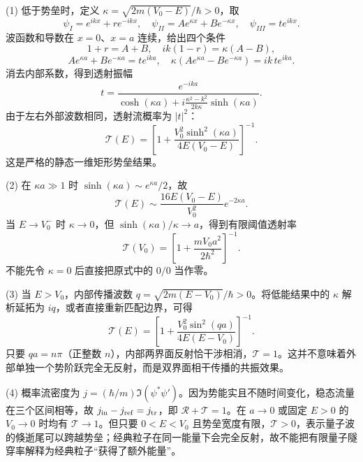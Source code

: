 (1) 低于势垒时，定义 \(\kappa=\sqrt{2m(V_0-E)}/\hbar>0\)，取
\[
\psi_I=e^{ikx}+r e^{-ikx},\quad
\psi_{II}=A e^{\kappa x}+B e^{-\kappa x},\quad
\psi_{III}=t e^{ikx}.
\]
波函数和导数在 \(x=0\)、\(x=a\) 连续，给出四个条件
\[
1+r=A+B,\quad ik(1-r)=\kappa(A-B),
\]
\[
Ae^{\kappa a}+Be^{-\kappa a}=te^{ika},\quad
\kappa(Ae^{\kappa a}-Be^{-\kappa a})=ik\,te^{ika}.
\]
消去内部系数，得到透射振幅
\[
t=\frac{e^{-ika}}{\cosh(\kappa a)+i\frac{\kappa^2-k^2}{2k\kappa}\sinh(\kappa a)}.
\]
由于左右外部波数相同，透射流概率为 \(|t|^2\)：
\[
\mathcal T(E)
=\left[1+\frac{V_0^2\sinh^2(\kappa a)}{4E(V_0-E)}\right]^{-1}.
\]
这是严格的静态一维矩形势垒结果。

(2) 在 \(\kappa a\gg1\) 时 \(\sinh(\kappa a)\sim e^{\kappa a}/2\)，故
\[
\mathcal T(E)\sim\frac{16E(V_0-E)}{V_0^2}e^{-2\kappa a}.
\]
当 \(E\to V_0^-\) 时 \(\kappa\to0\)，但 \(\sinh(\kappa a)/\kappa\to a\)，得到有限阈值透射率
\[
\mathcal T(V_0)=\left[1+\frac{mV_0a^2}{2\hbar^2}\right]^{-1}.
\]
不能先令 \(\kappa=0\) 后直接把原式中的 \(0/0\) 当作零。

(3) 当 \(E>V_0\)，内部传播波数 \(q=\sqrt{2m(E-V_0)}/\hbar>0\)。将低能结果中的 \(\kappa\) 解析延拓为 \(iq\)，或者直接重新匹配边界，可得
\[
\mathcal T(E)=\left[1+\frac{V_0^2\sin^2(qa)}{4E(E-V_0)}\right]^{-1}.
\]
只要 \(qa=n\pi\)（正整数 \(n\)），内部两界面反射恰干涉相消，\(\mathcal T=1\)。这并不意味着外部单独一个势阶跃完全无反射，而是双界面相干传播的共振效果。

(4) 概率流密度为 \(j=(\hbar/m)\Im(\psi^*\psi')\)。因为势能实且不随时间变化，稳态流量在三个区间相等，故 \(j_{\rm in}-j_{\rm ref}=j_{\rm tr}\)，即 \(\mathcal R+\mathcal T=1\)。在 \(a\to0\) 或固定 \(E>0\) 的 \(V_0\to0\) 时均有 \(\mathcal T\to1\)。但只要 \(0<E<V_0\) 且势垒宽度有限，\(\mathcal T>0\)，表示量子波的倏逝尾可以跨越势垒；经典粒子在同一能量下会完全反射，故不能把有限量子隧穿率解释为经典粒子“获得了额外能量”。
